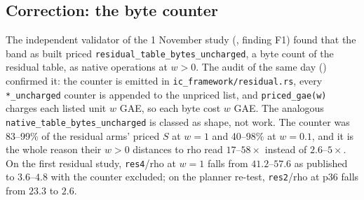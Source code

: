 \subsection{Correction: the byte counter}\label{sec:pg-bytes}

The independent validator of the 1 November study
(,
finding F1) found that the band as built priced
\texttt{residual\_table\_bytes\_uncharged}, a byte count of the residual
table, as native operations at $w>0$. The audit of the same day
() confirmed it: the
counter is emitted in \texttt{ic\_framework/residual.rs}, every
\texttt{*\_uncharged} counter is appended to the unpriced list, and
\texttt{priced\_gae(w)} charges each listed unit $w$ GAE, so each byte cost
$w$ GAE. The analogous \texttt{native\_table\_bytes\_uncharged} is classed
as shape, not work. The counter was 83--99\% of the residual arms' priced
$S$ at $w=1$ and 40--98\% at $w=0.1$, and it is the whole reason their $w>0$
distances to rho read $17$--$58\times$ instead of $2.6$--$5\times$. On the
first residual study, \texttt{res4}/rho at $w=1$ falls from $41.2$--$57.6$
as published to $3.6$--$4.8$ with the counter excluded; on the planner
re-test, \texttt{res2}/rho at p36 falls from $23.3$ to $2.6$.

